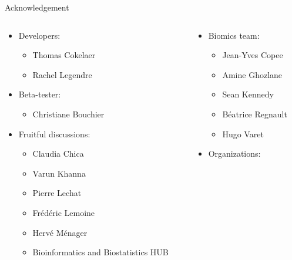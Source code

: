 \documentclass{beamer}
\begin{document}
\begin{frame}{Acknowledgement}
    \begin{columns}[t]
        \begin{column}{0.5\textwidth}
            \begin{itemize}
                \item Developers:
                \begin{itemize}
                    \item Thomas Cokelaer
                    \item Rachel Legendre
                \end{itemize}
                \item Beta-tester:
                    \begin{itemize}
                        \item Christiane Bouchier
                    \end{itemize}
                \item Fruitful discussions:
                    \begin{itemize}
                        \item Claudia Chica
                        \item Varun Khanna
                        \item Pierre Lechat
                        \item Frédéric Lemoine
                        \item Hervé Ménager
                        \item Bioinformatics and Biostatistics HUB 
                    \end{itemize}
            \end{itemize}
        \end{column}
        \begin{column}{0.5\textwidth}
            \begin{itemize}
                \item Biomics team:
                \begin{itemize}
                    \item Jean-Yves Copee
                    \item Amine Ghozlane
                    \item Sean Kennedy
                    \item Béatrice Regnault
                    \item Hugo Varet
                \end{itemize}
                \item Organizations:


\end{itemize}
\end{column}
\end{columns}
\end{frame}
\end{document}
